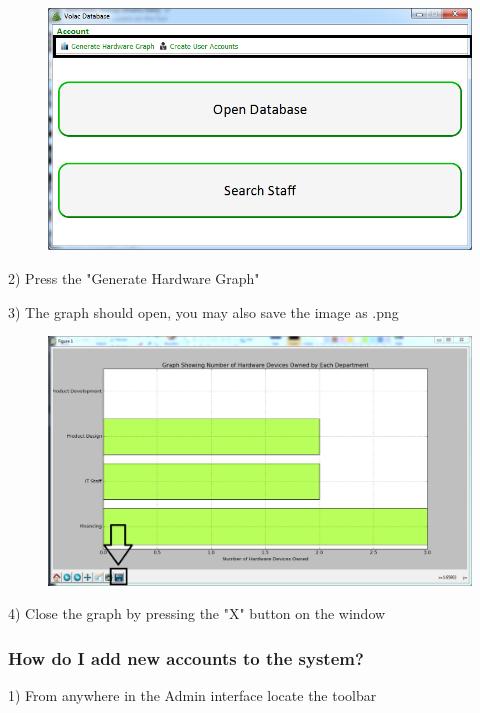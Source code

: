 \begin{figure}[H]
    \includegraphics[width=\textwidth]{./Manual/Images/graph1.png}
\end{figure}

2) Press the "Generate Hardware Graph"

3) The graph should open, you may also save the image as .png

\begin{figure}[H]
    \includegraphics[width=\textwidth]{./Manual/Images/graph2.png}
\end{figure}

4) Close the graph by pressing the "X" button on the window

\subsubsection{How do I add new accounts to the system?}

1) From anywhere in the Admin interface locate the toolbar

